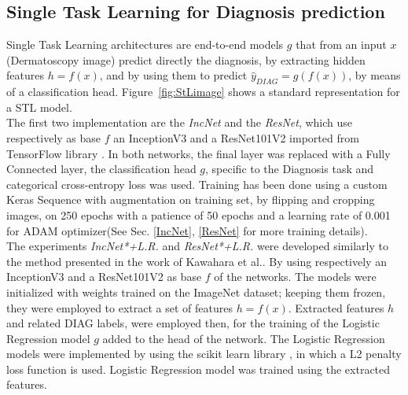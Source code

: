 \subsection{Single Task Learning for Diagnosis prediction}
Single Task Learning architectures are end-to-end models $g$ that from an input $x$ (Dermatoscopy image) predict directly the diagnosis, by extracting hidden features $h=f(x)$, and by using them to predict $\hat{y}_{DIAG}=g(f(x))$, by means of a classification head. Figure~\ref{fig:StLimage} shows a standard representation for a STL model.\\
The first two implementation are the \emph{IncNet} and the \emph{ResNet}, which use respectively as base $f$ an InceptionV3 and a ResNet101V2 imported from TensorFlow library \cite{tensorflow2015-whitepaper}.
In both networks, the final layer was replaced with a Fully Connected layer, the classification head $g$, specific to the Diagnosis task and categorical cross-entropy loss was used. Training has been done using a custom Keras Sequence with augmentation on training set, by flipping and cropping images, on 250 epochs with a patience of 50 epochs and a learning rate of
0.001 for ADAM optimizer(See Sec. \ref{IncNet}, \ref{ResNet} for more training details).\\
The experiments \emph{IncNet*+L.R.} and \emph{ResNet*+L.R.} were developed similarly to the method presented in the work of Kawahara et al.\cite{Kawahara}. By using respectively an InceptionV3 and a ResNet101V2 as base $f$ of the networks. The models were initialized with weights trained on the ImageNet dataset; keeping them frozen, they were employed to extract a set of features $h=f(x)$. Extracted features $h$ and related DIAG labels, were employed then, for the training of the Logistic Regression model $g$ added to the head of the network. The Logistic Regression models were implemented by using the scikit learn library \cite{scikit-learn}, in which a L2 penalty loss function is used. Logistic Regression model was trained using the extracted features.
